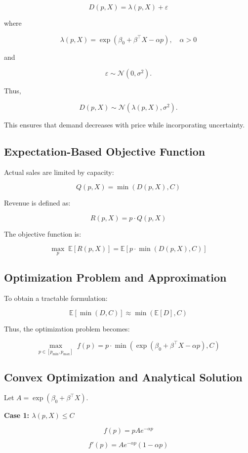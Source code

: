 \documentclass[12pt]{article}
\begin{document}
\[
D(p,X) = \lambda(p,X) + \varepsilon
\]

where

\[
\lambda(p,X) = \exp(\beta_0 + \beta^\top X - \alpha p), \quad \alpha > 0
\]

and

\[
\varepsilon \sim \mathcal{N}(0, \sigma^2).
\]

Thus,

\[
D(p,X) \sim \mathcal{N}(\lambda(p,X), \sigma^2).
\]

This ensures that demand decreases with price while incorporating uncertainty.

\subsection{Expectation-Based Objective Function}

Actual sales are limited by capacity:

\[
Q(p,X) = \min(D(p,X), C)
\]

Revenue is defined as:

\[
R(p,X) = p \cdot Q(p,X)
\]

The objective function is:

\[
\max_{p} \; \mathbb{E}[R(p,X)] = \mathbb{E}\left[p \cdot \min(D(p,X), C)\right]
\]

\subsection{Optimization Problem and Approximation}

To obtain a tractable formulation:

\[
\mathbb{E}[\min(D,C)] \approx \min(\mathbb{E}[D], C)
\]

Thus, the optimization problem becomes:

\[
\max_{p \in [p_{\min}, p_{\max}]} \; f(p) = p \cdot \min\left(\exp(\beta_0 + \beta^\top X - \alpha p), C \right)
\]

\subsection{Convex Optimization and Analytical Solution}

Let $A = \exp(\beta_0 + \beta^\top X)$.

\textbf{Case 1: $\lambda(p,X) \le C$}

\[
f(p) = p A e^{-\alpha p}
\]

\[
f'(p) = A e^{-\alpha p}(1 - \alpha p)
\]
\end{document}
